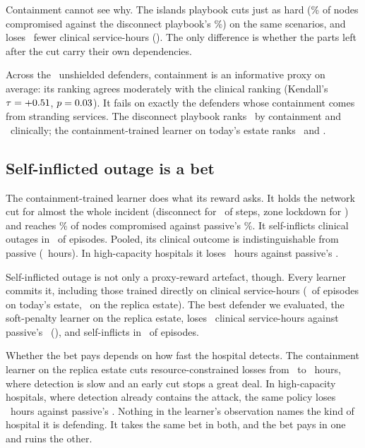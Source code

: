 Containment cannot see why. The islands playbook cuts just as hard
(\numIslandsSpread\% of nodes compromised against the disconnect playbook's
\numDisconnectSpread\%) on the same scenarios, and loses
\numKeyDisconnectToIslandsHoursAbs\ fewer clinical service-hours
(\numKeyDisconnectToIslandsHoursCi). The only difference is whether the
parts left after the cut carry their own dependencies.

Across the \numRankAgents\ unshielded defenders, containment is an
informative proxy on average: its ranking agrees moderately with the
clinical ranking (Kendall's $\tau=+0.51$, $p=0.03$). It fails on
exactly the defenders whose containment comes from stranding services. The
disconnect playbook ranks \numDisconnectRankContainment\ by containment and
\numDisconnectRankClinical\ clinically; the containment-trained learner on
today's estate ranks \numQContainmentTodayRankContainment\ and
\numQContainmentTodayRankClinical.

\subsection{Self-inflicted outage is a bet}

The containment-trained learner does what its reward asks. It holds the
network cut for almost the whole incident (disconnect for
\numQContainmentTodayShareDisconnect\ of steps, zone lockdown for
\numQContainmentTodayShareZoneLockdown) and reaches \numQContainmentTodaySpread\%
of nodes compromised against passive's \numPassiveSpread\%. It
self-inflicts clinical outages in \numQContainmentTodaySelfPct\ of episodes.
Pooled, its clinical outcome is indistinguishable from passive
(\numVsQContainmentTodayHoursCi\ hours). In high-capacity hospitals it loses
\numQContainmentTodayHighCapacityHours\ hours against passive's
\numPassiveHighCapacityHours.

Self-inflicted outage is not only a proxy-reward artefact, though. Every
learner commits it, including those trained directly on clinical
service-hours (\numQClinicalTodaySelfPct\ of episodes on today's estate,
\numQClinicalReplicasSelfPct\ on the replica estate). The best defender we
evaluated, the soft-penalty learner on the replica estate, loses
\numQSoftReplicasHours\ clinical service-hours against passive's
\numPassiveReplicasHours\ (\numVsQSoftReplicasHoursCi), and self-inflicts in
\numQSoftReplicasSelfPct\ of episodes.

Whether the bet pays depends on how fast the hospital detects. The
containment learner on the replica estate cuts resource-constrained
losses from \numPassiveReplicasResourceConstrainedHours\ to
\numQContainmentReplicasResourceConstrainedHours\ hours, where detection is
slow and an early cut stops a great deal. In high-capacity hospitals, where
detection already contains the attack, the same policy loses
\numQContainmentReplicasHighCapacityHours\ hours against passive's
\numPassiveReplicasHighCapacityHours. Nothing in the learner's observation
names the kind of hospital it is defending. It takes the same bet in both,
and the bet pays in one and ruins the other.

